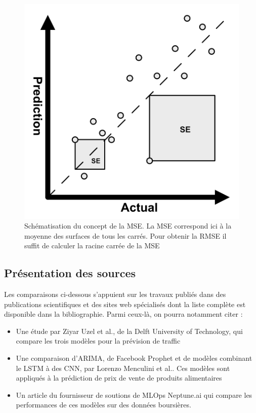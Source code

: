 \documentclass[french]{article}
\begin{document}
    \begin{figure}[h]
        \includegraphics[width=12cm]{mse}
        \centering
        \caption{Schématisation du concept de la MSE. La MSE correspond ici à la moyenne des surfaces de tous les carrés. Pour obtenir la RMSE il suffit de calculer la racine carrée de la MSE}
        \centering
    \end{figure}

    \subsection{Présentation des sources}

    Les comparaisons ci-dessous s'appuient sur les travaux publiés dans des publications scientifiques et des sites web spécialisés dont la liste complète est disponible dans la bibliographie. Parmi ceux-là, on pourra notamment citer :
    \begin{itemize}
        \item Une étude par Ziyar Uzel et al., de la Delft University of Technology\cite{uzel}, qui compare les trois modèles pour la prévision de traffic 
        \item Une comparaison d'ARIMA, de Facebook Prophet et de modèles combinant le LSTM à des CNN, par Lorenzo Menculini et al.\cite{menculini}. Ces modèles sont appliqués à la prédiction de prix de vente de produits alimentaires
        \item Un article du fournisseur de soutions de MLOps Neptune.ai\cite{neptune} qui compare les performances de ces modèles sur des données boursières.
    \end{itemize}
\end{document}
